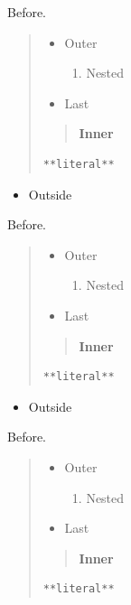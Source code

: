 Before.

\begin{quote}
\begin{itemize}
\item Outer
\begin{enumerate}
\item Nested
\end{enumerate}
\item Last
\end{itemize}

\begin{quote}
\textbf{Inner}
\end{quote}

\begin{verbatim}
**literal**
\end{verbatim}
\end{quote}

\begin{itemize}
\item Outside
\end{itemize}
Before.

\begin{quote}
\begin{itemize}
\item Outer
\begin{enumerate}
\item Nested
\end{enumerate}
\item Last
\end{itemize}

\begin{quote}
\textbf{Inner}
\end{quote}

\begin{verbatim}
**literal**
\end{verbatim}
\end{quote}

\begin{itemize}
\item Outside
\end{itemize}
Before.

\begin{quote}
\begin{itemize}
\item Outer
\begin{enumerate}
\item Nested
\end{enumerate}
\item Last
\end{itemize}

\begin{quote}
\textbf{Inner}
\end{quote}

\begin{verbatim}
**literal**
\end{verbatim}
\end{quote}

